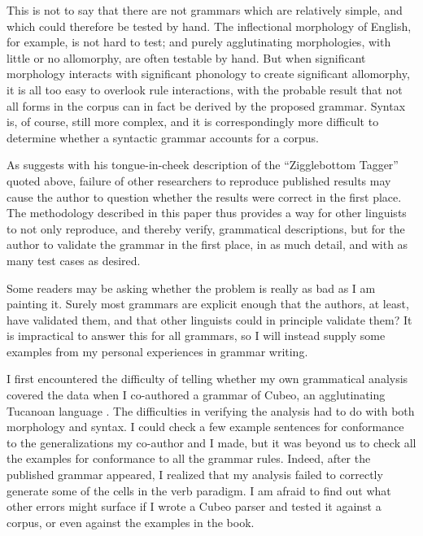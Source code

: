 This is not to say that there are not grammars which are relatively simple, and which could therefore be tested by hand. The inflectional morphology of English, for example, is not hard to test; and purely agglutinating morphologies, with little or no allomorphy, are often testable by hand. But when significant morphology interacts with significant phonology to create significant allomorphy, it is all too easy to overlook rule interactions, with the probable result that not all forms in the corpus can in fact be derived by the proposed grammar. Syntax is, of course, still more complex, and it is correspondingly more difficult to determine whether a syntactic grammar accounts for a corpus.

As \citet{Pedersen2008} suggests with his tongue-in-cheek description of the ``Zigglebottom Tagger'' quoted above, failure of other researchers to reproduce published results may cause the author to question whether the results were correct in the first place. The methodology described in this paper thus provides a way for other linguists to not only reproduce, and thereby verify, grammatical descriptions, but for the author to validate the grammar in the first place, in as much detail, and with as many test cases as desired.

Some readers may be asking whether the problem is really as bad as I am painting it. Surely most grammars are explicit enough that the authors, at least, have validated them, and that other linguists could in principle validate them? It is impractical to answer this for all grammars, so I will instead supply some examples from my personal experiences in grammar writing.

I first encountered the difficulty of telling whether my own grammatical analysis covered the data  when I co-authored a grammar of Cubeo, an agglutinating Tucanoan language \citep{MorseEtAl1999}. The difficulties in verifying the analysis had to do with both morphology and syntax. I could check a few example sentences for conformance to the generalizations my co-author and I made, but it was beyond us to check all the examples for conformance to all the grammar rules. Indeed, after the published grammar appeared, I realized that my analysis failed to correctly generate some of the cells in the verb paradigm. I am afraid to find out what other errors might surface if I wrote a Cubeo parser and tested it against a corpus, or even against the examples in the book.

